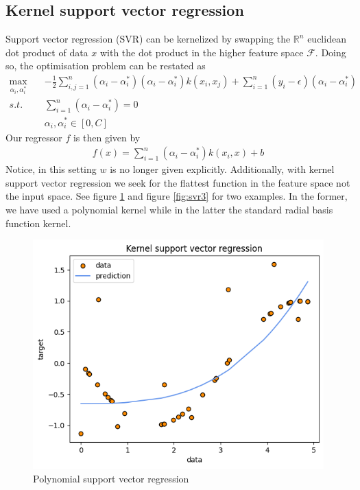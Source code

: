 \subsection{Kernel support vector regression}
Support vector regression (SVR) can be kernelized by swapping the $\mathbb{R}^n$ euclidean dot product of data $x$ with the dot product in the higher feature space $\mathcal{F}$. Doing so, the optimisation problem can be restated as
\begin{equation}
    \begin{aligned}
        \max_{\alpha_i, \alpha_i^*} \quad& -\frac{1}{2}\sum\limits_{i,j=1}^n(\alpha_i-\alpha_i^*)(\alpha_i-\alpha_i^*)k(x_i, x_j)+\sum\limits_{i=1}^n(y_i-\epsilon)(\alpha_i-\alpha_i^*)
        \\
        s.t. \quad& \sum\limits_{i=1}^n(\alpha_i-\alpha_i^*)=0
        \\
        \quad& \alpha_i, \alpha_i^* \in [0,C]
    \end{aligned}
\end{equation}
Our regressor $f$ is then given by
\begin{equation}
    \begin{aligned}
        f(x)=\sum\limits_{i=1}^n(\alpha_i-\alpha_i^*)k(x_i, x)+b
    \end{aligned}
\end{equation}
Notice, in this setting $w$ is no longer given explicitly. Additionally, with kernel support vector regression we seek for the flattest function in the feature space not the input space.
See figure \ref{fig:svr2} and figure \ref{fig:svr3} for two examples. In the former, we have used a polynomial kernel while in the latter the standard radial basis function kernel.
\begin{figure}
    \includegraphics[width=\textwidth]{images/svr2.png}
    \caption{Polynomial support vector regression}
    \label{fig:svr2}
\end{figure}

